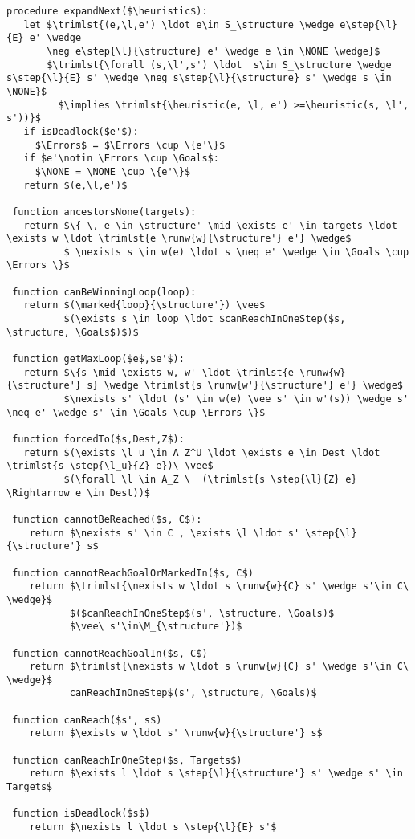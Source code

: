 \begin{lstlisting}[language={pseudocode},label={lst:dcs.aux},caption={Métodos auxiliares},float=ht, frame=single]
 procedure expandNext($\heuristic$):
   let $\trimlst{(e,\l,e') \ldot e\in S_\structure \wedge e\step{\l}{E} e' \wedge   
       \neg e\step{\l}{\structure} e' \wedge e \in \NONE \wedge}$ 
       $\trimlst{\forall (s,\l',s') \ldot  s\in S_\structure \wedge s\step{\l}{E} s' \wedge \neg s\step{\l}{\structure} s' \wedge s \in \NONE}$ 
         $\implies \trimlst{\heuristic(e, \l, e') >=\heuristic(s, \l',   s'))}$
   if isDeadlock($e'$):
     $\Errors$ = $\Errors \cup \{e'\}$
   if $e'\notin \Errors \cup \Goals$:
     $\NONE = \NONE \cup \{e'\}$
   return $(e,\l,e')$
 
 function ancestorsNone(targets):
   return $\{ \, e \in \structure' \mid \exists e' \in targets \ldot \exists w \ldot \trimlst{e \runw{w}{\structure'} e'} \wedge$
          $ \nexists s \in w(e) \ldot s \neq e' \wedge \in \Goals \cup \Errors \}$
   
 function canBeWinningLoop(loop):
   return $(\marked{loop}{\structure'}) \vee$ 
          $(\exists s \in loop \ldot $canReachInOneStep($s, \structure, \Goals$)$)$
   
 function getMaxLoop($e$,$e'$):
   return $\{s \mid \exists w, w' \ldot \trimlst{e \runw{w}{\structure'} s} \wedge \trimlst{s \runw{w'}{\structure'} e'} \wedge$ 
          $\nexists s' \ldot (s' \in w(e) \vee s' \in w'(s)) \wedge s' \neq e' \wedge s' \in \Goals \cup \Errors \}$

 function forcedTo($s,Dest,Z$):
   return $(\exists \l_u \in A_Z^U \ldot \exists e \in Dest \ldot \trimlst{s \step{\l_u}{Z} e})\ \vee$
          $(\forall \l \in A_Z \  (\trimlst{s \step{\l}{Z} e} \Rightarrow e \in Dest))$    
    
 function cannotBeReached($s, C$):
    return $\nexists s' \in C , \exists \l \ldot s' \step{\l}{\structure'} s$
   
 function cannotReachGoalOrMarkedIn($s, C$)
    return $\trimlst{\nexists w \ldot s \runw{w}{C} s' \wedge s'\in C\ \wedge}$ 
           $($canReachInOneStep$(s', \structure, \Goals)$
           $\vee\ s'\in\M_{\structure'})$
           
 function cannotReachGoalIn($s, C$)
    return $\trimlst{\nexists w \ldot s \runw{w}{C} s' \wedge s'\in C\ \wedge}$ 
           canReachInOneStep$(s', \structure, \Goals)$
           
 function canReach($s', s$)
    return $\exists w \ldot s' \runw{w}{\structure'} s$

 function canReachInOneStep($s, Targets$)
    return $\exists l \ldot s \step{\l}{\structure'} s' \wedge s' \in Targets$

 function isDeadlock($s$)
    return $\nexists l \ldot s \step{\l}{E} s'$
\end{lstlisting}

